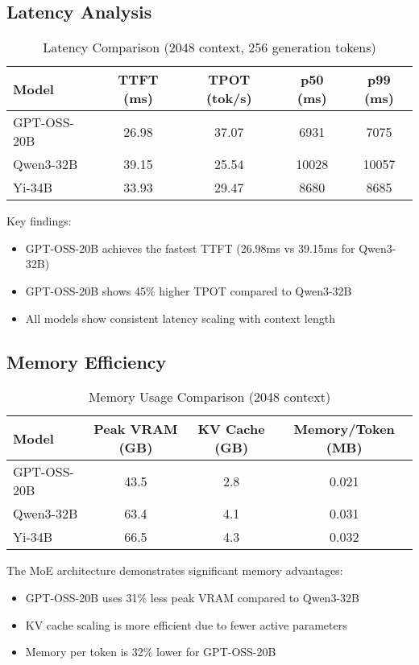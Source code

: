 \documentclass[11pt]{article}
\begin{document}
\subsection{Latency Analysis}

\begin{table}[h]
\centering
\caption{Latency Comparison (2048 context, 256 generation tokens)}
\begin{tabular}{lcccc}
\toprule
Model & TTFT (ms) & TPOT (tok/s) & p50 (ms) & p99 (ms) \\
\midrule
GPT-OSS-20B & 26.98 & 37.07 & 6931 & 7075 \\
Qwen3-32B & 39.15 & 25.54 & 10028 & 10057 \\
Yi-34B & 33.93 & 29.47 & 8680 & 8685 \\
\bottomrule
\end{tabular}
\end{table}

Key findings:
\begin{itemize}
    \item GPT-OSS-20B achieves the fastest TTFT (26.98ms vs 39.15ms for Qwen3-32B)
    \item GPT-OSS-20B shows 45\% higher TPOT compared to Qwen3-32B
    \item All models show consistent latency scaling with context length
\end{itemize}

\subsection{Memory Efficiency}

\begin{table}[h]
\centering
\caption{Memory Usage Comparison (2048 context)}
\begin{tabular}{lccc}
\toprule
Model & Peak VRAM (GB) & KV Cache (GB) & Memory/Token (MB) \\
\midrule
GPT-OSS-20B & 43.5 & 2.8 & 0.021 \\
Qwen3-32B & 63.4 & 4.1 & 0.031 \\
Yi-34B & 66.5 & 4.3 & 0.032 \\
\bottomrule
\end{tabular}
\end{table}

The MoE architecture demonstrates significant memory advantages:
\begin{itemize}
    \item GPT-OSS-20B uses 31\% less peak VRAM compared to Qwen3-32B
    \item KV cache scaling is more efficient due to fewer active parameters
    \item Memory per token is 32\% lower for GPT-OSS-20B
\end{itemize}
\end{document}
